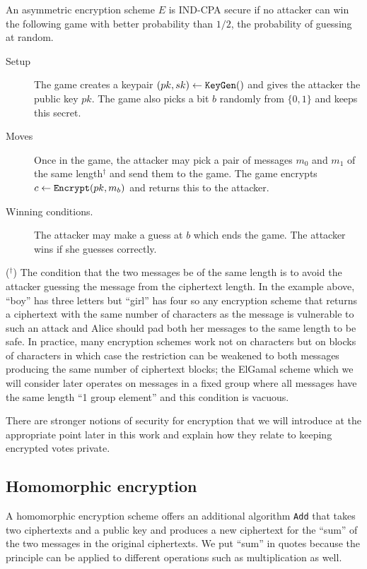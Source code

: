 \documentclass[envcountsame]{llncs}
\newcommand{\alg}[1]{\textup{\texttt{#1}}}
\begin{document}
\begin{definition}
An asymmetric encryption scheme $E$ is IND-CPA secure if no attacker can win the
following game with better probability than $1/2$, the probability of guessing
at random.

\begin{description}
\item[Setup] The game creates a keypair $(pk, sk) \gets \alg{KeyGen}()$ and
gives the attacker the public key $pk$. The game also picks a bit $b$ randomly
from $\{0, 1\}$ and keeps this secret.
\item[Moves] Once in the game, the attacker may pick a pair of messages $m_0$
and $m_1$ of the same length$^\dagger$ and send them to the game. The game
encrypts $c \gets \alg{Encrypt} (pk, m_b)$ and returns this to the attacker.
\item[Winning conditions.] The attacker may make a guess at $b$ which ends the
game. The attacker wins if she guesses correctly.
\end{description}
\end{definition}

\noindent($^\dagger$) The condition that the two messages be of the same length
is to avoid the attacker guessing the message from the ciphertext length. In the
example above, ``boy'' has three letters but ``girl'' has four so any encryption
scheme that returns a ciphertext with the same number of characters as the
message is vulnerable to such an attack and Alice should pad both her messages
to the same length to be safe. In practice, many encryption schemes work not on
characters but on blocks of characters in which case the restriction can be
weakened to both messages producing the same number of ciphertext blocks; the
ElGamal scheme which we will consider later operates on messages in a fixed
group where all messages have the same length ``1 group element'' and this
condition is vacuous.

There are stronger notions of security for encryption that we will introduce at
the appropriate point later in this work and explain how they relate to keeping
encrypted votes private.

\subsection{Homomorphic encryption}

A homomorphic encryption scheme offers an additional algorithm \alg{Add} that takes two ciphertexts and a public key and produces a new ciphertext for the ``sum'' of the two messages in the original ciphertexts. We put ``sum'' in quotes because the principle can be applied to different operations such as multiplication as well.
\end{document}
